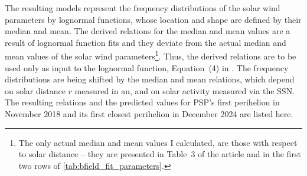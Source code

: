 \bigskip

The resulting models represent the frequency distributions of the solar wind parameters by lognormal functions, whose location and shape are defined by their median and mean.
The derived relations for the median and mean values are a result of lognormal function fits and they deviate from the actual median and mean values of the solar wind parameters\footnote{The only actual median and mean values I calculated, are those with respect to solar distance -- they are presented in Table~3 of the article and in the first two rows of \autoref{tab:bfield_fit_parameters}.}. Thus, the derived relations are to be used only as input to the lognormal function, Equation~(4) in \citet{Venzmer2018}.
The frequency distributions are being shifted by the median and mean relations, which depend on solar distance $r$ measured in au, and on solar activity measured via the SSN. The resulting relations and the predicted values for PSP's first perihelion in November 2018 and its first closest perihelion in December 2024 are listed here.
